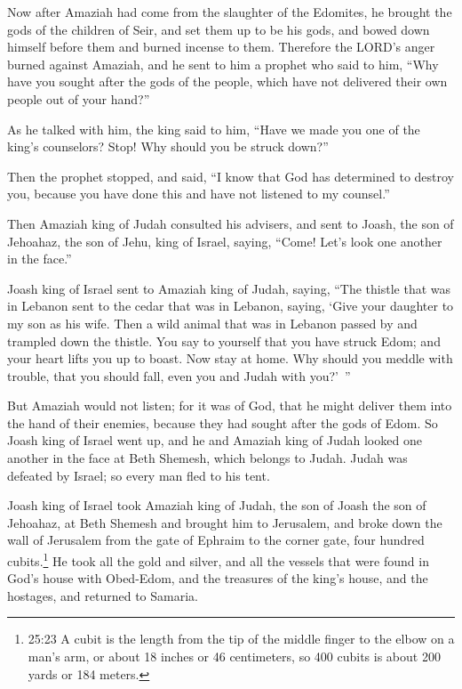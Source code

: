 \myverse{}Now after Amaziah had come from the slaughter of the Edomites,
he brought the gods of the children of Seir, and set them up to be his gods, and bowed down himself before
them and burned incense to them.
\myverse{}Therefore the LORD’s anger burned against Amaziah, and he sent to him a prophet
who said to him, “Why have you sought after the gods of the people, which have not delivered their own
people out of your hand?”

\myverse{}As he talked with him, the king said to him, “Have we made you
one of the king’s counselors? Stop! Why should you be struck down?”

Then the prophet stopped, and said, “I know that God has determined to destroy you, because
you have done this and have not listened to my counsel.”

\myverse{}Then Amaziah king of Judah consulted his advisers, and sent
to Joash, the son of Jehoahaz, the son of Jehu, king of Israel, saying, “Come! Let’s look one another
in the face.”

\myverse{}Joash king of Israel sent to Amaziah king of Judah, saying,
“The thistle that was in Lebanon sent to the cedar that was in Lebanon, saying, ‘Give your daughter to
my son as his wife. Then a wild animal that was in Lebanon passed by and trampled down the thistle.
\myverse{}You say to yourself that you have struck Edom; and your heart lifts you up
to boast. Now stay at home. Why should you meddle with trouble, that you should fall, even you and Judah
with you?’ ”

\myverse{}But Amaziah would not listen; for it was of God, that he might
deliver them into the hand of their enemies, because they had sought after the gods of Edom.
\myverse{}So Joash king of Israel went up, and he and Amaziah king of Judah looked
one another in the face at Beth Shemesh, which belongs to Judah.
\myverse{}Judah was defeated by Israel; so every man fled to his tent.

\myverse{}Joash king of Israel took Amaziah king of Judah, the son of
Joash the son of Jehoahaz, at Beth Shemesh and brought him to Jerusalem, and broke down the wall of Jerusalem
from the gate of Ephraim to the corner gate, four hundred cubits.\footnote{25:23 A cubit is the length from the tip of the middle finger to the elbow on a man’s arm, or about
	18 inches or 46 centimeters, so 400 cubits is about 200 yards or 184 meters.}
\myverse{}He took all the gold and silver, and all the vessels that were found in God’s
house with Obed-Edom, and the treasures of the king’s house, and the hostages, and returned to Samaria.

